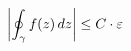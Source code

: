 \documentclass[preview]{standalone}
\begin{document}
\begin{align*}
\special{dvisvgm:raw <g id='unique000'>}\left|\oint_{\gamma} f(z)\,dz\right| \le C \cdot \varepsilon\special{dvisvgm:raw </g>}
\end{align*}
\end{document}
